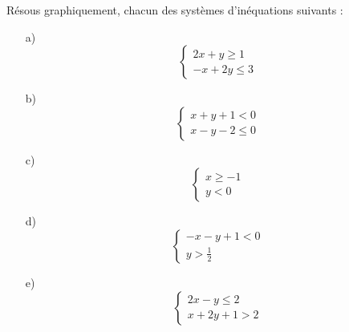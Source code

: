 \documentclass[12pt]{article}
\begin{document}
Résous graphiquement, chacun des systèmes d’inéquations suivants :
\begin{itemize}
    \item[a)] 
    \[
    \begin{cases}
        2x + y \geq 1 \\
        -x + 2y \leq 3
    \end{cases}
    \]
    \item[b)]
    \[
    \begin{cases}
        x + y + 1 < 0 \\
        x - y - 2 \leq 0
    \end{cases}
    \]
    \item[c)]
    \[
    \begin{cases}
        x \geq -1 \\
        y < 0
    \end{cases}
    \]
    \item[d)]
    \[
    \begin{cases}
        -x - y + 1 < 0 \\
        y > \frac{1}{2}
    \end{cases}
    \]
    \item[e)]
    \[
    \begin{cases}
        2x - y \leq 2 \\
        x + 2y + 1 > 2
    \end{cases}
    \]
\end{itemize}
\end{document}
